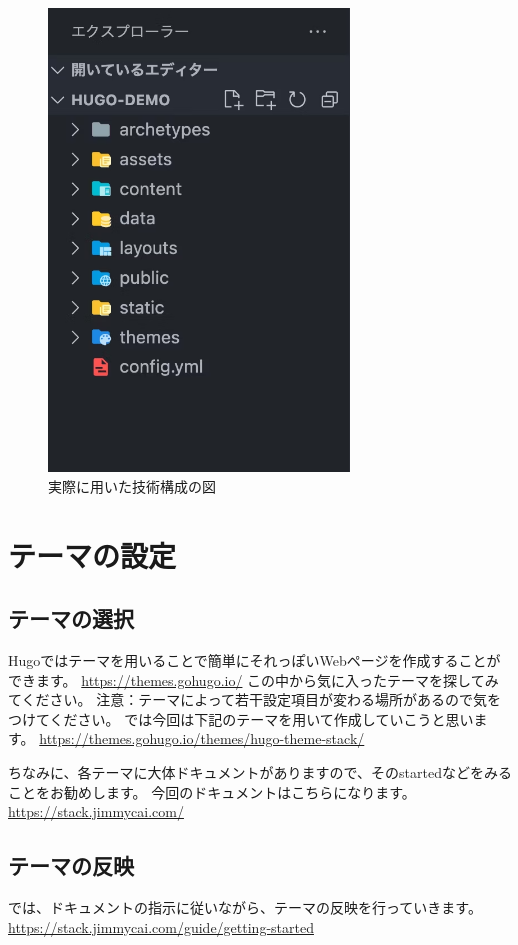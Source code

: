   \begin{figure}[H]
    \centering
    \includegraphics[width=8cm]{./image/02-chap5/filetree.png}
    \caption{実際に用いた技術構成の図}
    \label{chap5-firetree-image}
  \end{figure}

\section{テーマの設定}
  \subsection{テーマの選択}
    Hugoではテーマを用いることで簡単にそれっぽいWebページを作成することができます。
    \url{https://themes.gohugo.io/}
    この中から気に入ったテーマを探してみてください。
    注意：テーマによって若干設定項目が変わる場所があるので気をつけてください。
    では今回は下記のテーマを用いて作成していこうと思います。
    \url{https://themes.gohugo.io/themes/hugo-theme-stack/}

    ちなみに、各テーマに大体ドキュメントがありますので、そのstartedなどをみることをお勧めします。
    今回のドキュメントはこちらになります。
    \url{https://stack.jimmycai.com/}

  \subsection{テーマの反映}
    では、ドキュメントの指示に従いながら、テーマの反映を行っていきます。
    \url{https://stack.jimmycai.com/guide/getting-started}


